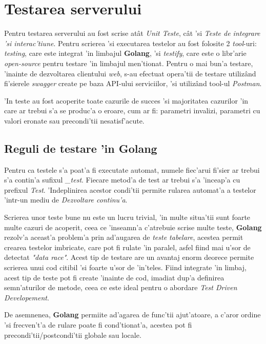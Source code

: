 \documentclass[12pt,a4paper,twoside]{report}
\begin{document}
\section{Testarea serverului}
Pentru testarea serverului au fost scrise atât \textit{Unit Teste}, cât 'si \textit{Teste de integrare 'si interac'tiune}. Pentru scrierea 'si executarea testelor au fost folosite 2 \textit{tool}-uri: \textit{testing}, care este integrat 'in limbajul \textbf{Golang}, 'si \textit{testify}, care este o libr'arie \textit{open-source} pentru testare 'in limbajul men'tionat. Pentru o mai bun'a testare, 'inainte de dezvoltarea clientului \textit{web}, s-au efectuat opera'tii de testare utilizând fi'sierele \textit{swagger} create pe baza API-ului serviciilor, 'si utilizând tool-ul \textit{Postman}.

'In teste au fost acoperite toate cazurile de succes 'si majoritatea cazurilor 'in care ar trebui s'a se produc'a o eroare, cum ar fi: parametri invalizi, parametri cu valori eronate sau precondi'tii nesatisf'acute.

\subsection{Reguli de testare 'in Golang}
Pentru ca testele s'a poat'a fi executate automat, numele fiec'arui fi'sier ar trebui s'a contin'a sufixul \textit{\_test}. Fiecare metod'a de test ar trebui s'a 'inceap'a cu prefixul \textit{Test}. 'Indeplinirea acestor condi'tii permite rularea automat'a a testelor 'intr-un mediu de \textit{Dezvoltare continu'a}.

Scrierea unor teste bune nu este un lucru trivial, 'in multe situa'tii sunt foarte multe cazuri de acoperit, ceea ce 'inseamn'a c'atrebuie scrise multe teste, \textbf{Golang} rezolv'a aceast'a problem'a prin ad'augarea de \textit{teste tabelare}, acestea permit crearea testelor imbricate, care pot fi rulate 'in paralel, asfel fiind mai u'sor de detectat \textit{"data race"}. Acest tip de testare are un avantaj enorm deorece permite scrierea unui cod citibil 'si foarte u'sor de 'in'teles. Fiind integrate 'in limbaj, acest tip de teste pot fi create 'inainte de cod, imadiat dup'a definirea semn'aturilor de metode, ceea ce este ideal pentru o abordare \textit{Test Driven Developement}.

De asemnenea, \textbf{Golang} permiite ad'agarea de func'tii ajut'atoare, a c'aror ordine 'si frecven't'a de rulare poate fi cond'tionat'a, acestea pot fi precondi'tii/postcondi'tii globale sau locale.
\end{document}
